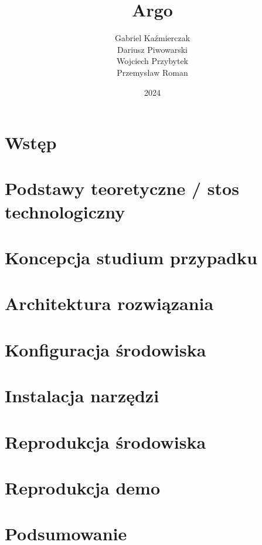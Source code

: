 \documentclass{article}
\title{\textbf{Argo}}
\author{Gabriel Kaźmierczak\\ Dariusz Piwowarski\\ Wojciech Przybytek\\ Przemysław Roman}
\date{2024}
\begin{document}
\begin{titlingpage}
\maketitle
\end{titlingpage}

\newpage
\tableofcontents

\newpage
\section{Wstęp}

\newpage
\section{Podstawy teoretyczne / stos technologiczny}

\newpage
\section{Koncepcja studium przypadku}

\newpage
\section{Architektura rozwiązania}

\newpage
\section{Konfiguracja środowiska}

\newpage
\section{Instalacja narzędzi}

\newpage
\section{Reprodukcja środowiska}

\newpage
\section{Reprodukcja demo}

\newpage
\section{Podsumowanie}

\newpage
\nocite{*}
\printbibliography[heading=bibintoc,title={Źródła}]
\end{document}
